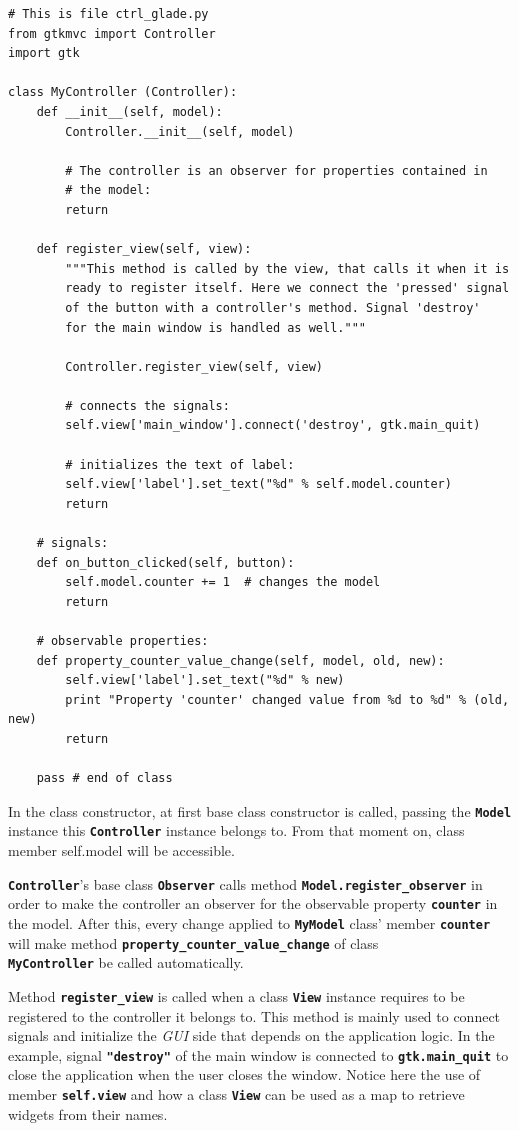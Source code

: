 \documentclass{article}
\newcommand{\kw}[1]{\emph{#1}\xspace}
\newcommand{\gui}{\kw{GUI}}
\newcommand{\codename}[1]{\texttt{\bfseries \textcolor {codecolor}{#1}}\xspace}
\newcommand{\codesize}{\small } %
\begin{document}
{ \codesize 
\begin{verbatim}   
# This is file ctrl_glade.py
from gtkmvc import Controller
import gtk

class MyController (Controller):
    def __init__(self, model):
        Controller.__init__(self, model)

        # The controller is an observer for properties contained in
        # the model:
        return

    def register_view(self, view):
        """This method is called by the view, that calls it when it is
        ready to register itself. Here we connect the 'pressed' signal
        of the button with a controller's method. Signal 'destroy'
        for the main window is handled as well."""

        Controller.register_view(self, view)

        # connects the signals:
        self.view['main_window'].connect('destroy', gtk.main_quit)
        
        # initializes the text of label:
        self.view['label'].set_text("%d" % self.model.counter)
        return
       
    # signals:
    def on_button_clicked(self, button):
        self.model.counter += 1  # changes the model
        return

    # observable properties:
    def property_counter_value_change(self, model, old, new):
        self.view['label'].set_text("%d" % new)
        print "Property 'counter' changed value from %d to %d" % (old, new)
        return
    
    pass # end of class
\end{verbatim}
} 

In the class constructor, at first base class constructor is called,
passing the \codename{Model} instance this \codename{Controller}
instance belongs to. From that moment on, class member self.model will
be accessible.

\codename{Controller}'s base class \codename{Observer} calls method
\codename{Model.register\_observer} in order to make the controller
an observer for the observable property \codename{counter} in the
model. After this, every change applied to \codename{MyModel} class'
member \codename{counter} will make method
\codename{property\_counter\_value\_change} of class \\
\codename{MyController} be called automatically.

Method \codename{register\_view} is called when a class
\codename{View} instance requires to be registered to the controller
it belongs to.  This method is mainly used to connect signals and
initialize the \gui side that depends on the application logic. In
the example, signal \codename{"destroy"} of the main window is
connected to \codename{gtk.main\_quit} to close the application when
the user closes the window. Notice here the use of member
\codename{self.view} and how a class \codename{View} can be used as
a map to retrieve widgets from their names.
\end{document}
